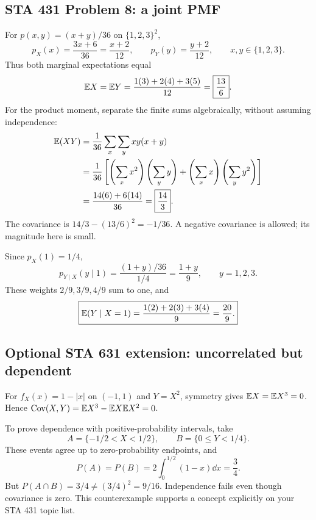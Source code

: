 \subsection{STA 431 Problem 8: a joint PMF}
For $p(x,y)=(x+y)/36$ on $\{1,2,3\}^2$,
\[
p_X(x)=\frac{3x+6}{36}=\frac{x+2}{12},\qquad
p_Y(y)=\frac{y+2}{12},\qquad x,y\in\{1,2,3\}.
\]
Thus both marginal expectations equal
\[
\mathbb E X=\mathbb E Y=\frac{1(3)+2(4)+3(5)}{12}=\boxed{\frac{13}{6}}.
\]
For the product moment, separate the finite sums algebraically, without assuming independence:
\begin{align*}
\mathbb E(XY)&=\frac1{36}\sum_x\sum_yxy(x+y)\\
&=\frac1{36}\left[\left(\sum_xx^2\right)\left(\sum_yy\right)
+\left(\sum_xx\right)\left(\sum_yy^2\right)\right]\\
&=\frac{14(6)+6(14)}{36}=\boxed{\frac{14}{3}}.
\end{align*}
The covariance is $\boxed{14/3-(13/6)^2=-1/36}$. A negative covariance is allowed; its magnitude here is small.

Since $p_X(1)=1/4$,
\[
p_{Y\mid X}(y\mid1)=\frac{(1+y)/36}{1/4}=\frac{1+y}{9},\qquad y=1,2,3.
\]
These weights $2/9,3/9,4/9$ sum to one, and
\[
\boxed{\mathbb E(Y\mid X=1)=\frac{1(2)+2(3)+3(4)}9=\frac{20}{9}.}
\]

\subsection{Optional STA 631 extension: uncorrelated but dependent}
For $f_X(x)=1-|x|$ on $(-1,1)$ and $Y=X^2$, symmetry gives $\mathbb E X=\mathbb E X^3=0$. Hence $\operatorname{Cov}(X,Y)=\mathbb E X^3-\mathbb E X\mathbb E X^2=0$.

To prove dependence with positive-probability intervals, take
\[
A=\{-1/2<X<1/2\},\qquad B=\{0\le Y<1/4\}.
\]
These events agree up to zero-probability endpoints, and
\[
P(A)=P(B)=2\int_0^{1/2}(1-x)\dd x=\frac34.
\]
But $P(A\cap B)=3/4\ne(3/4)^2=9/16$. Independence fails even though covariance is zero. This counterexample supports a concept explicitly on your STA 431 topic list.
